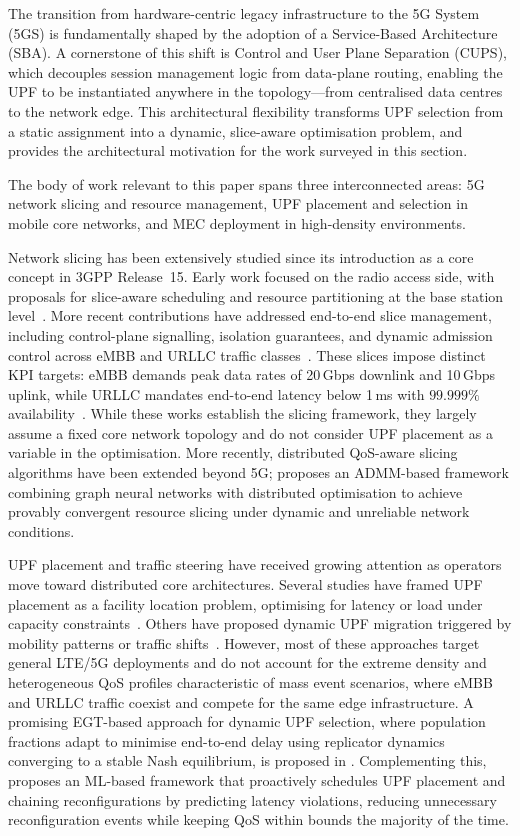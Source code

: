 \documentclass[conference]{IEEEtran}
\begin{document}
The transition from hardware-centric legacy infrastructure to the
5G System (5GS) is fundamentally shaped by the adoption of a
Service-Based Architecture (SBA). A cornerstone of this shift is
Control and User Plane Separation (CUPS), which decouples session
management logic from data-plane routing, enabling the UPF to be
instantiated anywhere in the topology---from centralised data
centres to the network edge. This architectural flexibility
transforms UPF selection from a static assignment into a dynamic,
slice-aware optimisation problem, and provides the architectural
motivation for the work surveyed in this section.

The body of work relevant to this paper spans three interconnected
areas: 5G network slicing and resource management, UPF placement
and selection in mobile core networks, and MEC deployment in
high-density environments.

Network slicing has been extensively studied since its introduction
as a core concept in 3GPP Release~15. Early work focused on the
radio access side, with proposals for slice-aware scheduling and
resource partitioning at the base station
level~\cite{zhang2019network}. More recent contributions have
addressed end-to-end slice management, including control-plane
signalling, isolation guarantees, and dynamic admission control
across eMBB and URLLC traffic classes~\cite{popovski2018wireless}.
These slices impose distinct KPI targets: eMBB demands peak data
rates of 20\,Gbps downlink and 10\,Gbps uplink, while URLLC
mandates end-to-end latency below 1\,ms with $99.999\%$
availability~\cite{3gpp_ts22261}.
While these works establish the slicing framework, they largely
assume a fixed core network topology and do not consider UPF
placement as a variable in the optimisation. More recently,
distributed QoS-aware slicing algorithms have been extended beyond
5G; \cite{Asheralieva2024slicing} proposes an ADMM-based framework
combining graph neural networks with distributed optimisation to
achieve provably convergent resource slicing under dynamic and
unreliable network conditions.

UPF placement and traffic steering have received growing attention
as operators move toward distributed core architectures. Several
studies have framed UPF placement as a facility location problem,
optimising for latency or load under capacity
constraints~\cite{Goshi2024upf}. Others have proposed dynamic UPF
migration triggered by mobility patterns or traffic
shifts~\cite{sama2016software}. However, most of these approaches
target general LTE/5G deployments and do not account for the
extreme density and heterogeneous QoS profiles characteristic of
mass event scenarios, where eMBB and URLLC traffic coexist and
compete for the same edge infrastructure. A promising EGT-based
approach for dynamic UPF selection, where population fractions
adapt to minimise end-to-end delay using replicator dynamics
converging to a stable Nash equilibrium, is proposed in
\cite{Alevizaki2021upf}. Complementing this, \cite{LeyvaUPC2023}
proposes an ML-based framework that proactively schedules UPF
placement and chaining reconfigurations by predicting latency
violations, reducing unnecessary reconfiguration events while
keeping QoS within bounds the majority of the time.
\end{document}
